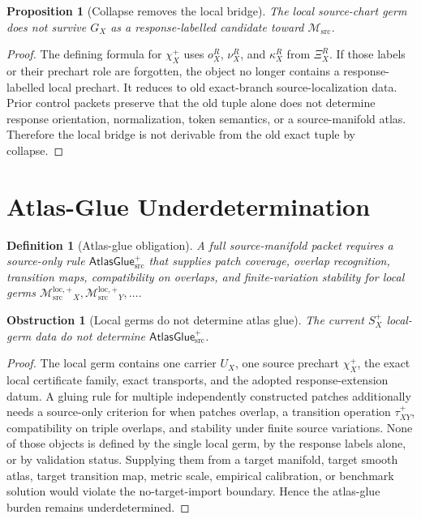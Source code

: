 \documentclass[11pt]{article}
\newcommand{\Msrc}{\mathcal{M}_{\mathrm{src}}}
\newcommand{\Mloc}{\mathcal{M}_{\mathrm{src}}^{\mathrm{loc},+}}
\newcommand{\XiR}{\Xi_X^R}
\newcommand{\Splus}{S_X^+}
\newcommand{\AtlasGlue}{\mathsf{AtlasGlue}_{\mathrm{src}}^{+}}
\newcommand{\tauXY}{\tau_{XY}^{+}}
\newtheorem{definition}{Definition}
\newtheorem{proposition}{Proposition}
\newtheorem{obstruction}{Obstruction}
\begin{document}
\begin{proposition}[Collapse removes the local bridge]
The local source-chart germ does not survive \(G_X\) as a response-labelled
candidate toward \(\Msrc\).
\end{proposition}

\begin{proof}
The defining formula for \(\chi_X^+\) uses \(o_X^R\), \(\nu_X^R\), and
\(\kappa_X^R\) from \(\XiR\). If those labels or their prechart role are
forgotten, the object no longer contains a response-labelled local prechart.
It reduces to old exact-branch source-localization data. Prior control packets
preserve that the old tuple alone does not determine response orientation,
normalization, token semantics, or a source-manifold atlas. Therefore the
local bridge is not derivable from the old exact tuple by collapse.
\end{proof}

\section{Atlas-Glue Underdetermination}

\begin{definition}[Atlas-glue obligation]
A full source-manifold packet requires a source-only rule \(\AtlasGlue\) that
supplies patch coverage, overlap recognition, transition maps, compatibility
on overlaps, and finite-variation stability for local germs
\(\Mloc_X,\Mloc_Y,\ldots\).
\end{definition}

\begin{obstruction}[Local germs do not determine atlas glue]
The current \(\Splus\) local-germ data do not determine \(\AtlasGlue\).
\end{obstruction}

\begin{proof}
The local germ contains one carrier \(U_X\), one source prechart
\(\chi_X^+\), the exact local certificate family, exact transports, and the
adopted response-extension datum. A gluing rule for multiple independently
constructed patches additionally needs a source-only criterion for when
patches overlap, a transition operation \(\tauXY\), compatibility on triple
overlaps, and stability under finite source variations. None of those objects
is defined by the single local germ, by the response labels alone, or by
validation status. Supplying them from a target manifold, target smooth atlas,
target transition map, metric scale, empirical calibration, or benchmark
solution would violate the no-target-import boundary. Hence the atlas-glue
burden remains underdetermined.
\end{proof}
\end{document}
